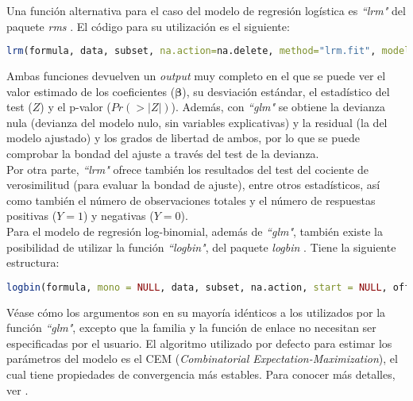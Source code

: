 Una función alternativa para el caso del modelo de regresión logística es \textit{``lrm"} del paquete \textit{rms} \autocite{rms}. El código para su utilización es el siguiente:
\begin{lstlisting}[language=R, caption=Uso de la función lrm \{rms\} en R.]
 lrm(formula, data, subset, na.action=na.delete, method="lrm.fit", model=FALSE, x=FALSE, y=FALSE, linear.predictors=TRUE, se.fit=FALSE, penalty=0, penalty.matrix, tol=1e-7, strata.penalty=0, var.penalty=c('simple','sandwich'), weights, normwt, scale=FALSE, ...)
\end{lstlisting}

Ambas funciones devuelven un \textit{output} muy completo en el que se puede ver el valor estimado de los coeficientes ($\boldsymbol{\beta}$), su desviación estándar, el estadístico del test ($Z$) y el p-valor ($Pr(>|Z|)$). Además, con \textit{``glm"} se obtiene la devianza nula (devianza del modelo nulo, sin variables explicativas) y la residual (la del modelo ajustado) y los grados de libertad de ambos, por lo que se puede comprobar la bondad del ajuste a través del test de la devianza. \\

Por otra parte, \textit{``lrm"} ofrece también los resultados del test del cociente de verosimilitud (para evaluar la bondad de ajuste), entre otros estadísticos, así como también el número de observaciones totales y el número de respuestas positivas ($Y=1$) y negativas ($Y=0$). \\

Para el modelo de regresión log-binomial, además de \textit{``glm"}, también existe la posibilidad de utilizar la función \textit{``logbin"}, del paquete \textit{logbin} \autocite{logbinR}. Tiene la siguiente estructura:
\begin{lstlisting}[language=R, caption=Uso de la función logbin \{logbin\} en R.]
 logbin(formula, mono = NULL, data, subset, na.action, start = NULL, offset, control = list(...), model = TRUE, method = c("cem", "em", "glm", "glm2", "ab"), accelerate = c("em", "squarem", "pem", "qn"), control.method = list(), warn = TRUE, ...)
\end{lstlisting}

Véase cómo los argumentos son en su mayoría idénticos a los utilizados por la función  \textit{``glm"}, excepto que la familia y la función de enlace no necesitan ser especificadas por el usuario. El algoritmo utilizado por defecto para estimar los parámetros del modelo es el CEM (\textit{Combinatorial Expectation-Maximization}), el cual tiene propiedades de convergencia más estables. Para conocer más detalles, ver \textcite{logbinom2}.

